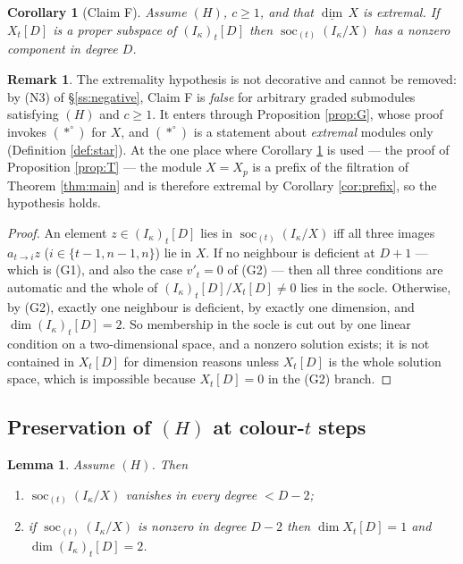 \documentclass[reqno]{amsart}
\theoremstyle{plain}
\newtheorem{lemma}[theorem]{Lemma}
\newtheorem{corollary}[theorem]{Corollary}
\theoremstyle{definition}
\newtheorem{remark}[theorem]{Remark}
\DeclareMathOperator{\soc}{soc}
\newcommand{\dimv}{\underline{\dim}\,}
\newcommand{\ka}{\kappa}
\begin{document}
\begin{corollary}[Claim F]\label{cor:F}
Assume $(H)$, $c\ge1$, \emph{and that $\dimv X$ is extremal}.  If $X_t[D]$ is
a proper subspace of $(I_\ka)_t[D]$ then $\soc_{(t)}(I_\ka/X)$ has a nonzero
component in degree $D$.
\end{corollary}

\begin{remark}\label{rem:Fextremal}
The extremality hypothesis is not decorative and cannot be removed: by
\textup{(N3)} of \S\ref{ss:negative}, Claim F is \emph{false} for arbitrary
graded submodules satisfying $(H)$ and $c\ge1$.  It enters through
Proposition \ref{prop:G}, whose proof invokes $(*^\circ)$ for $X$, and
$(*^\circ)$ is a statement about \emph{extremal} modules only (Definition
\ref{def:star}).  At the one place where Corollary \ref{cor:F} is used --- the
proof of Proposition \ref{prop:T} --- the module $X=X_p$ is a prefix of the
filtration of Theorem \ref{thm:main} and is therefore extremal by Corollary
\ref{cor:prefix}, so the hypothesis holds.
\end{remark}

\begin{proof}
An element $z\in(I_\ka)_t[D]$ lies in $\soc_{(t)}(I_\ka/X)$ iff all three
images $a_{t\to i}z$ ($i\in\{t-1,n-1,n\}$) lie in $X$.  If no neighbour is
deficient at $D+1$ --- which is (G1), and also the case $v'_t=0$ of (G2) ---
then all three conditions are automatic and the whole of
$(I_\ka)_t[D]/X_t[D]\ne0$ lies in the socle.  Otherwise, by (G2), exactly one
neighbour is deficient, by exactly one dimension, and $\dim(I_\ka)_t[D]=2$.  So
membership in the socle is cut out by one linear condition on a
two-dimensional space, and a nonzero solution exists; it is not contained in
$X_t[D]$ for dimension reasons unless $X_t[D]$ is the whole solution space,
which is impossible because $X_t[D]=0$ in the (G2) branch.
\end{proof}

\subsection{Preservation of \texorpdfstring{$(H)$}{(H)} at colour-$t$ steps}

\begin{lemma}\label{lem:ab}
Assume $(H)$.  Then
\begin{enumerate}
\item[\textup{(a)}] $\soc_{(t)}(I_\ka/X)$ vanishes in every degree $<D-2$;
\item[\textup{(b)}] if $\soc_{(t)}(I_\ka/X)$ is nonzero in degree $D-2$ then
$\dim X_t[D]=1$ and $\dim(I_\ka)_t[D]=2$.
\end{enumerate}
\end{lemma}
\end{document}
